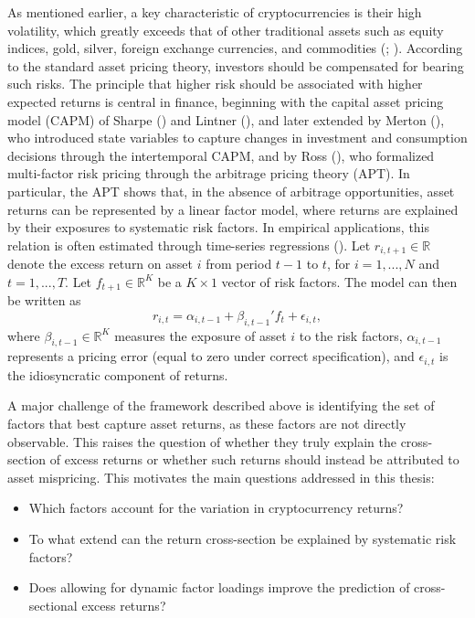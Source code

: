 \documentclass[
  12pt,
  a4paper,
  openany]{scrbook}
\providecommand{\tightlist}{%
  \setlength{\itemsep}{0pt}\setlength{\parskip}{0pt}}
\begin{document}
As mentioned earlier, a key characteristic of cryptocurrencies is their
high volatility, which greatly exceeds that of other traditional assets
such as equity indices, gold, silver, foreign exchange currencies, and
commodities (; ).
According to the standard asset pricing theory, investors should be
compensated for bearing such risks. The principle that higher risk
should be associated with higher expected returns is central in finance,
beginning with the capital asset pricing model (CAPM) of Sharpe
() and Lintner
(), and later extended by
Merton (), who
introduced state variables to capture changes in investment and
consumption decisions through the intertemporal CAPM, and by Ross
(), who formalized
multi-factor risk pricing through the arbitrage pricing theory (APT). In
particular, the APT shows that, in the absence of arbitrage
opportunities, asset returns can be represented by a linear factor
model, where returns are explained by their exposures to systematic risk
factors. In empirical applications, this relation is often estimated
through time-series regressions
(). Let
\(r_{i,t+1} \in \mathbb{R}\) denote the excess return on asset \(i\)
from period \(t-1\) to \(t\), for \(i = 1, ..., N\) and
\(t = 1, ..., T\). Let \(f_{t+1} \in \mathbb{R}^K\) be a \(K \times 1\)
vector of risk factors. The model can then be written as\\
\[
r_{i,t} = \alpha_{i,t-1} + \beta_{i,t-1}' f_{t} + \epsilon_{i,t},
\] where \(\beta_{i,t-1} \in \mathbb{R}^K\) measures the exposure of
asset \(i\) to the risk factors, \(\alpha_{i,t-1}\) represents a pricing
error (equal to zero under correct specification), and
\(\epsilon_{i,t}\) is the idiosyncratic component of returns.

A major challenge of the framework described above is identifying the
set of factors that best capture asset returns, as these factors are not
directly observable. This raises the question of whether they truly
explain the cross-section of excess returns or whether such returns
should instead be attributed to asset mispricing. This motivates the
main questions addressed in this thesis:

\begin{itemize}
\tightlist
\item
  Which factors account for the variation in cryptocurrency returns?
\item
  To what extend can the return cross-section be explained by systematic
  risk factors?
\item
  Does allowing for dynamic factor loadings improve the prediction of
  cross-sectional excess returns?
\end{itemize}
\end{document}
